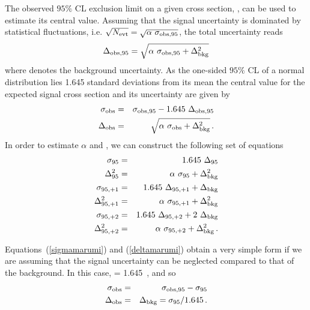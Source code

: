 \documentclass[12pt]{article}
\begin{document}
\begin{appendices}
The observed $95\%$ CL exclusion limit on a given cross
section, \sigmaobsnfive, can be used to estimate its
central value. Assuming that the
signal uncertainty is dominated by statistical fluctuations,
i.e. $\sqrt{N_{\rm evt}} = \sqrt{\alpha~\sigma_{\rm obs,95}}$, the total
uncertainty reads   
\begin{equation}
\Delta_{\rm obs,95} = \sqrt {\alpha~\sigma_{\rm obs,95} + \Delta_{\rm bkg}^2} 
\end{equation}
where \deltabkg denotes the background uncertainty. 
As the one-sided $95\%$ CL of a normal distribution
lies 1.645 standard deviations from its mean the
central value for the expected signal cross section \sigmaobs and its
uncertainty are given by 
\begin{eqnarray} 
\sigma_{\rm obs} &=& \sigma_{\rm obs,95} - 1.645~\Delta_{\rm obs,95} \label{sigmamarumi} \\
\Delta_{\rm obs} &=& \sqrt{\alpha~\sigma_{\rm obs} + \Delta_{\rm bkg}^2}  \, . \label{deltamarumi}
\end{eqnarray}
In order to estimate $\alpha$ and \deltabkg, we can construct 
the following set of equations 
\begin{eqnarray}
\sigma_{\rm 95} &=& 1.645~\Delta_{\rm 95} \\ 
\Delta_{\rm 95}^2 &=& \alpha~\sigma_{\rm 95} + \Delta_{\rm bkg}^2 \\
\sigma_{\rm 95,+1} &=& 1.645~\Delta_{\rm 95,+1} + \Delta_{\rm bkg} \\ 
\Delta_{\rm 95,+1}^2 &=& \alpha~\sigma_{\rm 95,+1} + \Delta_{\rm bkg}^2 \\
\sigma_{\rm 95,+2} &=& 1.645~\Delta_{\rm 95,+2} + 2~\Delta_{\rm bkg} \\ 
\Delta_{\rm 95,+2}^2 &=& \alpha~\sigma_{\rm 95,+2} + \Delta_{\rm bkg}^2 \, . 
\end{eqnarray}

Equations~(\ref{sigmamarumi}) and (\ref{deltamarumi}) obtain a very simple form  
if we are assuming that the signal uncertainty can be neglected  
compared to that of the background. In this case, \sigmanfive =
1.645~\deltabkg, and so 
\begin{eqnarray}
\sigma_{\rm obs} &=& \sigma_{\rm obs,95} - \sigma_{\rm 95} \label{sigmasimple} \\
\Delta_{\rm obs} &=& \Delta_{\rm bkg} = \sigma_{\rm 95} / 1.645  \, . \label{deltasimple}
\end{eqnarray}



\end{appendices}
\end{document}
